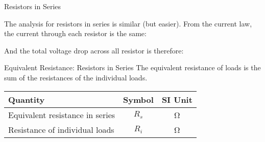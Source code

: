 \documentclass[12pt,aspectratio=169]{beamer}
\begin{document}
\begin{frame}{Resistors in Series}
  \begin{center}
  \end{center}

  \vspace{.1in}The analysis for resistors in series is similar (but easier).
  From the current law, the current through each resistor is the same:


  \vspace{-.15in}And the total voltage drop across all resistor is therefore:

\end{frame}



\begin{frame}{Equivalent Resistance: Resistors in Series}
  The equivalent resistance of loads is the sum of the resistances of the
  individual loads.
  
  \begin{center}
    \begin{tabular}{l|c|c}
      \rowcolor{pink}
      \textbf{Quantity} & \textbf{Symbol} & \textbf{SI Unit} \\ \hline
      Equivalent resistance in series & $R_s$ & \si\ohm \\
      Resistance of individual loads  & $R_i$ & \si\ohm
    \end{tabular}
  \end{center}
\end{frame}
\end{document}
